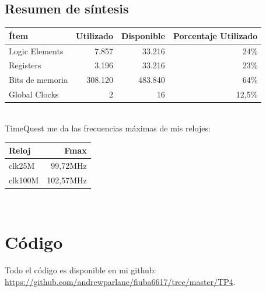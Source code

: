 \documentclass[a4paper]{article}
\begin{document}
\subsection{Resumen de síntesis}
\begin{tabular}{| l | r | r | r|}
\hline
\textbf{Ítem} & \textbf{Utilizado} & \textbf{Disponible} & \textbf{Porcentaje Utilizado} \\ \hline
Logic Elements & 7.857 & 33.216 & 24\% \\
Registers & 3.196 & 33.216 & 23\% \\
Bits de memoria & 308.120 & 483.840 & 64\% \\
Global Clocks & 2 & 16 & 12,5\% \\ \hline
\end{tabular} \\

TimeQuest me da las frecuencias máximas de mis relojes: \\

\begin{tabular}{| l | r |}
\hline
\textbf{Reloj} & \textbf{Fmax} \\ \hline
clk25M & 99,72MHz \\
clk100M & 102,57MHz \\ \hline
\end{tabular} \\

\section{Código}

Todo el código es disponible en mi github: \url{https://github.com/andrewparlane/fiuba6617/tree/master/TP4}.
\end{document}
